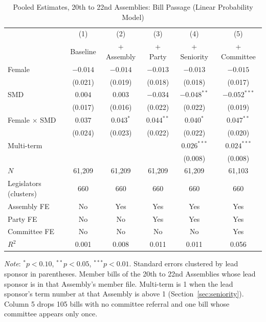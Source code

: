 \documentclass[11pt]{article}
\begin{document}
\begin{table}[htbp]
\centering
\caption{Pooled Estimates, 20th to 22nd Assemblies: Bill Passage (Linear Probability Model)}
\label{tab:main}
\small
\begin{tabular}{lccccc}
\toprule
& (1) & (2) & (3) & (4) & (5) \\
& Baseline & + Assembly & + Party & + Seniority & + Committee \\
\midrule
Female               & $-0.014$ & $-0.014$ & $-0.013$ & $-0.013$ & $-0.015$ \\
                     & (0.021) & (0.019) & (0.018) & (0.018) & (0.017) \\[3pt]
SMD                  & $0.004$ & $0.003$ & $-0.034$ & $-0.048^{**}$ & $-0.052^{***}$ \\
                     & (0.017) & (0.016) & (0.022) & (0.022) & (0.019) \\[3pt]
Female $\times$ SMD  & $0.037$ & $0.043^{*}$ & $0.044^{**}$ & $0.040^{*}$ & $0.047^{**}$ \\
                     & (0.024) & (0.023) & (0.022) & (0.022) & (0.020) \\[3pt]
Multi-term &  &  &  & $0.026^{***}$ & $0.024^{***}$ \\
 &  &  &  & (0.008) & (0.008) \\
\midrule
$N$             & 61,209 & 61,209 & 61,209 & 61,209 & 61,103 \\
Legislators (clusters) & 660 & 660 & 660 & 660 & 660 \\
Assembly FE     & No & Yes & Yes & Yes & Yes \\
Party FE        & No & No & Yes & Yes & Yes \\
Committee FE    & No & No & No & No & Yes \\
$R^2$           & 0.001 & 0.008 & 0.011 & 0.011 & 0.056 \\
\bottomrule
\end{tabular}

\vspace{4pt}
\parbox{0.9\textwidth}{\footnotesize \textit{Note}: $^*p<0.10$, $^{**}p<0.05$, $^{***}p<0.01$. Standard errors clustered by lead sponsor in parentheses. Member bills of the 20th to 22nd Assemblies whose lead sponsor is in that Assembly's member file. Multi-term is 1 when the lead sponsor's term number at that Assembly is above 1 (Section~\ref{sec:seniority}). Column 5 drops 105 bills with no committee referral and one bill whose committee appears only once.}
\end{table}
\end{document}
